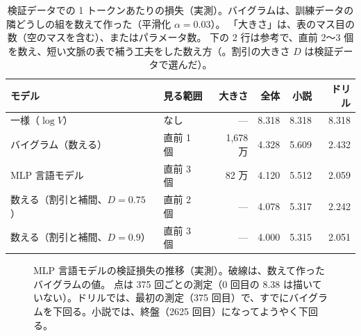 \begin{table}[tbp]
\centering
\caption{検証データでの 1 トークンあたりの損失（実測）。バイグラムは、訓練データの隣どうしの組を数えて作った（平滑化 $\alpha=0.03$）。
「大きさ」は、表のマス目の数（空のマスを含む）、またはパラメータ数。
下の 2 行は参考で、直前 2〜3 個を数え、短い文脈の表で補う工夫をした数え方（。割引の大きさ $D$ は検証データで選んだ）。}
\label{tab:emb-compare}
\small
\begin{tabular}{llrrrr}
\toprule
モデル & 見る範囲 & 大きさ & 全体 & 小説 & ドリル \\
\midrule
一様（$\log V$） & なし & --- & 8.318 & 8.318 & 8.318 \\
バイグラム（数える） & 直前 1 個 & 1,678 万 & 4.328 & 5.609 & 2.432 \\
MLP 言語モデル & 直前 3 個 & 82 万 & 4.120 & 5.512 & 2.059 \\
\midrule
数える（割引と補間、$D=0.75$） & 直前 2 個 & --- & 4.078 & 5.317 & 2.242 \\
数える（割引と補間、$D=0.9$） & 直前 3 個 & --- & 4.000 & 5.315 & 2.051 \\
\bottomrule
\end{tabular}
\end{table}

\begin{figure}[tbp]
\centering
{}
\caption{MLP 言語モデルの検証損失の推移（実測）。破線は、数えて作ったバイグラムの値。
点は 375 回ごとの測定（0 回目の 8.38 は描いていない）。ドリルでは、最初の測定（375 回目）で、すでにバイグラムを下回る。小説では、終盤（2625 回目）になってようやく下回る。}
\label{fig:emb-curve}
\end{figure}

